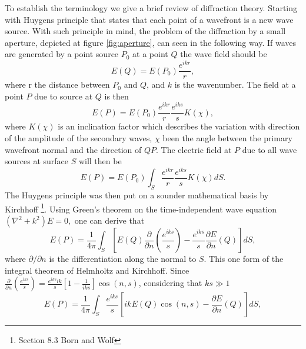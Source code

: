 \documentclass[12pt,twoside,english]{book}
\renewcommand{\~}{\perispomeni}%
\numberwithin{equation}{section}
\numberwithin{figure}{section}
\begin{document}
To establish the terminology we give a brief review of diffraction theory. Starting with Huygens principle that states that each point of a wavefront is a new wave source. With such principle in mind, the problem of the diffraction by a small aperture, depicted at figure \ref{fig:aperture}, can seen in the following way. If waves are generated by a point source $P_{0}$ at a point $Q$ the wave field should be
\begin{equation}
E\left(Q\right)=E\left(P_{0}\right)\frac{e^{ikr}}{r},
\label{}
\end{equation}
where r the distance between $P_{0}$ and $Q$, and $k$ is the wavenumber. The field at a point $P$ due to source at $Q$ is then
\begin{equation}
E\left(P\right)=E\left(P_{0}\right)\frac{e^{ikr}}{r}\frac{e^{iks}}{s}K\left(\chi\right),
\end{equation}
where $K\left(\chi\right)$ is an inclination factor which describes the variation with direction of the amplitude of the secondary waves, $\chi$ been the angle between the primary wavefront normal and the direction of $QP$. The electric field at $P$ due to all wave sources at surface $S$ will then be
\begin{equation}
E\left(P\right)=E\left(P_{0}\right)\int_{S}\frac{e^{ikr}}{r}\frac{e^{iks}}{s}K\left(\chi\right)dS.
\label{eq:huygens formula}
\end{equation}
The Huygens principle was then put on a sounder mathematical basis by Kirchhoff \footnote{Section 8.3 Born and Wolf}. Using Green's theorem on the time-independent wave equation $\left(\nabla^{2}+k^{2}\right)E=0,$ one can derive that
\begin{equation}
E\left(P\right)=\frac{1}{4\pi}\int_{S}\left[E\left(Q\right)\frac{\partial}{\partial n}\left(\frac{e^{iks}}{s}\right)-\frac{e^{iks}}{s}\frac{\partial E}{\partial n}\left(Q\right)\right]dS,
\end{equation}
where $\partial/\partial n$ is the differentiation along the normal to $S$. This one form of the integral theorem of Helmholtz and Kirchhoff. Since $\frac{\partial}{\partial n}\left(\frac{e^{iks}}{s}\right)=\frac{e^{iks}ik}{s}\left[1-\frac{1}{iks}\right]\cos\left(n,s\right)$, considering that $ks\gg1$
\begin{equation}
E\left(P\right)=\frac{1}{4\pi}\int_{S}\frac{e^{iks}}{s}\left[ikE\left(Q\right)\cos\left(n,s\right)-\frac{\partial E}{\partial n}\left(Q\right)\right]dS,
\label{eq:integral theorem}
\end{equation}
\end{document}
